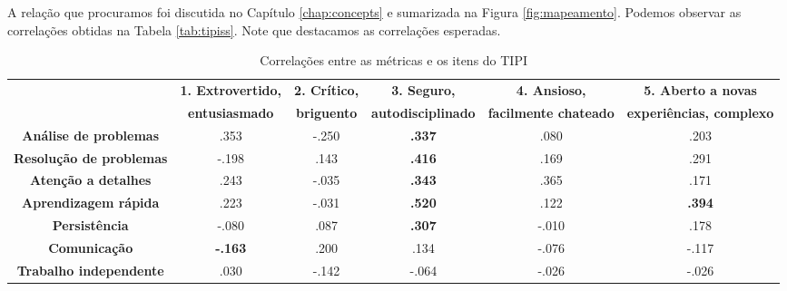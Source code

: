A relação que procuramos foi discutida no Capítulo \ref{chap:concepts} e sumarizada na Figura \ref{fig:mapeamento}.
Podemos observar as correlações obtidas na Tabela \ref{tab:tipiss}. Note que destacamos as correlações esperadas. 

\begin{sidewaystable}[ph!]
\footnotesize
\caption{\small Correlações entre as métricas e os itens do TIPI}
\renewcommand{\arraystretch}{1.4} 
\centering
\begin{tabular}{lccccc}

    \toprule		
		& \textbf{1. Extrovertido, }  & \textbf{2. Crítico, } & \textbf{3. Seguro, } 			 & \textbf{4. Ansioso, } 				& \textbf{5. Aberto a novas } \\
		& \textbf{entusiasmado} 			& \textbf{briguento} 		& \textbf{autodisciplinado} & \textbf{facilmente chateado} & \textbf{experiências, complexo} \\
					
    \midrule
    \multicolumn{1}{c}{\textbf{Análise de problemas}} 		& .353  				 & -.250 & \textbf{.337} & .080  & .203 				 \\
		\multicolumn{1}{c}{\textbf{Resolução de problemas}}	  & -.198  				 & .143  & \textbf{.416} & .169  & .291 				 \\
    \multicolumn{1}{c}{\textbf{Atenção a detalhes}} 			& .243  				 & -.035 & \textbf{.343} & .365  & .171 				 \\
		\multicolumn{1}{c}{\textbf{Aprendizagem rápida}} 			& .223   			   & -.031 & \textbf{.520} & .122  & \textbf{.394} \\
    \multicolumn{1}{c}{\textbf{Persistência}} 						& -.080  				 & .087  & \textbf{.307} & -.010 & .178 				 \\
    \multicolumn{1}{c}{\textbf{Comunicação}} 							& \textbf{-.163} & .200  & .134  			   & -.076 & -.117 				 \\
    \multicolumn{1}{c}{\textbf{Trabalho independente}} 		& .030  				 & -.142 & -.064 				 & -.026 & -.026 				 \\ 
		

\end{tabular}
\end{sidewaystable}
